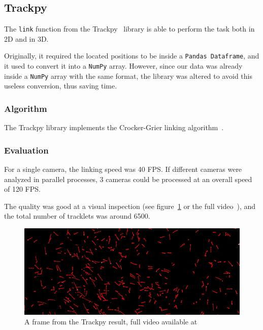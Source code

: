 \subsection{Trackpy}
\label{sec:link2d:trackpy}

The \texttt{link} function from the Trackpy~\cite{trackpy} library is able to perform the \link* task both in 2D and in 3D.

Originally, it required the located positions to be inside a \texttt{Pandas Dataframe}, and it used to convert it into a \texttt{NumPy} array.
However, since our data was already inside a \texttt{NumPy} array with the same format, the library was altered to avoid this useless conversion, thus saving time.

\subsubsection{Algorithm}

The Trackpy library implements the Crocker-Grier linking algorithm~\cite{trackpy-link}.

\subsubsection{Evaluation}

For a single camera, the linking speed was 40 FPS.
If different cameras were analyzed in parallel processes, 3 cameras could be processed at an overall speed of 120 FPS.

The quality was good at a visual inspection (see figure~\ref{fig:linkDD:trackpy} or the full video~\cite{linkDD-trackpy}), and the total number of tracklets was around 6500.

\begin{figure}
	\centerline{\includegraphics[width=\locateimgsize]{images/link2d/trackpy.png}}
	\caption{\centering A frame from the Trackpy \linkDD* result, full video available at~\cite{linkDD-trackpy}}
	\label{fig:linkDD:trackpy}
\end{figure}

